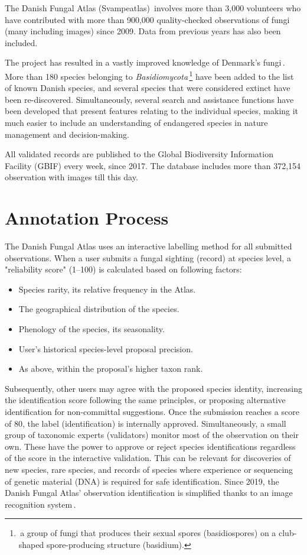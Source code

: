\documentclass[10pt,twocolumn,letterpaper]{article}
\begin{document}
The Danish Fungal Atlas (Svampeatlas)\,\cite{svampe_databasen, svampeatlas_data, heilmann2019citizen} involves more than 3,000 volunteers who have contributed with more than 900,000 quality-checked observations of fungi (many including images) since 2009. Data from previous years has also been included.

The project has resulted in a vastly improved knowledge of Denmark's fungi\,\cite{heilmann2019citizen}. More than 180 species belonging to \textit{Basidiomycota}\,\footnote{\,a group of fungi that produces their sexual spores (basidiospores) on a club-shaped spore-producing structure (basidium).} have been added to the list of known Danish species, and several species that were considered extinct have been re-discovered. Simultaneously, several search and assistance functions have been developed that present features relating to the individual species, making it much easier to include an understanding of endangered species in nature management and decision-making.

All validated records are published to the Global Biodiversity Information Facility (GBIF) every week, since 2017. The database includes more than 372,154 observation with images till this day.

\section{Annotation Process}

The Danish Fungal Atlas uses an interactive labelling method for all submitted observations. When a user submits a fungal sighting (record) at species level, a "reliability score" (1--100) is calculated based on following factors:
\begin{itemize}[noitemsep,topsep=0pt,leftmargin=0.5cm]
    \item Species rarity, \ie its relative frequency in the Atlas.
    \item The geographical distribution of the species.
    \item Phenology of the species, its seasonality.
    \item User's historical species-level proposal precision.
    \item As above, within the proposal's higher taxon rank.
\end{itemize}
Subsequently, other users may agree with the proposed species identity, increasing the identification score following the same principles, or proposing alternative identification for non-committal suggestions.  Once the submission reaches a score of 80, the label (identification) is internally approved. Simultaneously, a small group of taxonomic experts (validators) monitor most of the observation on their own. These have the power to approve or reject species identifications regardless of the score in the interactive validation. This can be relevant for discoveries of new species, rare species, and records of species where experience or sequencing of genetic material (DNA) is required for safe identification. Since 2019, the Danish Fungal Atlas' observation identification is simplified thanks to an image recognition system\,\cite{fungiUsecase}.
\end{document}
